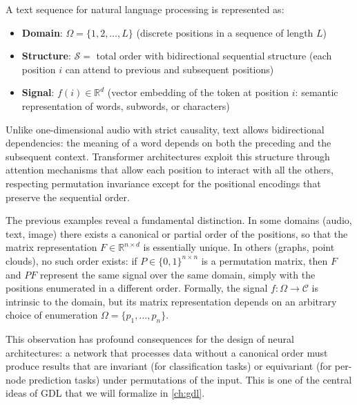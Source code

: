 \begin{example}\label{ex:secuencia_texto}
A text sequence for natural language processing is represented as:
\begin{itemize}
	\item \textbf{Domain}: $\Omega = \{1, 2, \ldots, L\}$ (discrete positions in a sequence of length $L$)
	\item \textbf{Structure}: $\mathcal{S} = $ total order with bidirectional sequential structure (each position $i$ can attend to previous and subsequent positions)
	\item \textbf{Signal}: $f(i) \in \mathbb{R}^d$ (vector embedding of the token at position $i$: semantic representation of words, subwords, or characters)
\end{itemize}

Unlike one-dimensional audio with strict causality, text allows bidirectional dependencies: the meaning of a word depends on both the preceding and the subsequent context. \gls{Transformer} architectures exploit this structure through attention mechanisms that allow each position to interact with all the others, respecting permutation invariance except for the positional encodings that preserve the sequential order.
\end{example}

\begin{remark}\label{rem:invarianza_permutacion}
The previous examples reveal a fundamental distinction. In some domains (audio, text, image) there exists a canonical or partial order of the positions, so that the matrix representation $F \in \mathbb{R}^{n \times d}$ is essentially unique. In others (graphs, point clouds), no such order exists: if $P \in \{0,1\}^{n \times n}$ is a permutation matrix, then $F$ and $PF$ represent the same signal over the same domain, simply with the positions enumerated in a different order. Formally, the signal $f: \Omega \to \mathcal{C}$ is intrinsic to the domain, but its matrix representation depends on an arbitrary choice of enumeration $\Omega = \{p_1, \ldots, p_n\}$.

This observation has profound consequences for the design of neural architectures: a network that processes data without a canonical order must produce results that are invariant (for classification tasks) or equivariant (for per-node prediction tasks) under permutations of the input. This is one of the central ideas of \gls{GDL} that we will formalize in \autoref{ch:gdl}.
\end{remark}


